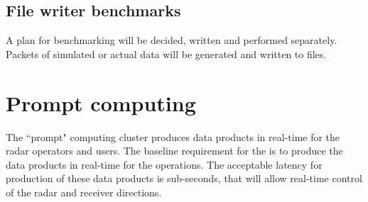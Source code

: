 \documentclass[12pt,a4paper]{article}
\begin{document}
 \subsection{File writer benchmarks}

A plan for benchmarking will be decided, written and performed separately. 
Packets of simulated or actual \fsru data will be generated and written to files.


\section{Prompt computing}


The ``prompt" computing cluster produces data products in real-time for the radar operators and users.
The baseline requirement for the \pc is to produce the data products in real-time for the \NBW operations.
The acceptable latency for production of these data products is sub-seconds, that will allow real-time control of the radar and receiver directions. 
\end{document}
